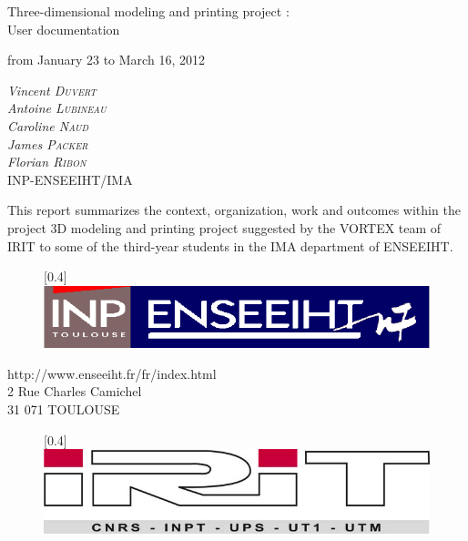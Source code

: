 \documentclass{article}
\begin{document}
\bigskip
\bigskip
\bigskip
\bigskip
\bigskip
\bigskip
\bigskip
\bigskip

\begin{center}
\LARGE{Three-dimensional modeling and printing project :\\User documentation \\}
\bigskip
\bigskip\begin{tiny}
\end{tiny}
\Large{from January 23 to March 16, 2012}
\end{center}

\bigskip
\bigskip

\begin{center}
\large{
\textit{Vincent \textsc{Duvert} \\
Antoine \textsc{Lubineau} \\
Caroline \textsc{Naud} \\
James \textsc{Packer} \\
Florian \textsc{Ribon}} \\
\bigskip
INP-ENSEEIHT/IMA 
}
\end{center}

\bigskip
\bigskip

	This report summarizes the context, organization, work and outcomes within the project 3D modeling and printing project suggested by the VORTEX team of IRIT to some of the third-year students in the IMA department of ENSEEIHT.

\bigskip
\bigskip

\begin{figure}[!h]
\begin{center}
\scalebox{0.4}[0.4]{\includegraphics{./Images/enseeiht}}
\end{center}
\end{figure}

\bigskip

\begin{center}
http://www.enseeiht.fr/fr/index.html \\
2 Rue Charles Camichel \\
31 071 TOULOUSE
\end{center}

\bigskip

\begin{figure}[!h]
\begin{center}
\scalebox{0.4}[0.4]{\includegraphics{./Images/irit}}
\end{center}
\end{figure}
\end{document}
